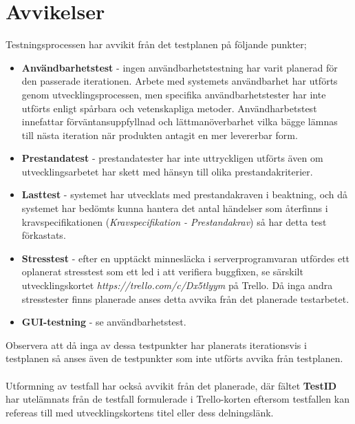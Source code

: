 \section{Avvikelser}
Testningsprocessen har avvikit från det testplanen på följande punkter; 

\begin{itemize}
\item \textbf{Användbarhetstest} - ingen användbarhetstestning har varit planerad för den passerade iterationen. Arbete med systemets användbarhet har utförts genom utvecklingsprocessen, men specifika användbarhetstester har inte utförts enligt spårbara och vetenskapliga metoder. Användharbetstest innefattar förväntansuppfyllnad och lättmanöverbarhet vilka bägge lämnas till nästa iteration när produkten antagit en mer levererbar form. 
\item \textbf{Prestandatest} - prestandatester har inte uttryckligen utförts även om utvecklingsarbetet har skett med hänsyn till olika prestandakriterier.
\item \textbf{Lasttest} - systemet har utvecklats med prestandakraven i beaktning, och då systemet har bedömts kunna hantera det antal händelser som återfinns i kravspecifikationen (\textit{Kravspecifikation - Prestandakrav}) så har detta test förkastats.
\item \textbf{Stresstest} - efter en upptäckt minnesläcka i serverprogramvaran utfördes ett oplanerat stresstest som ett led i att verifiera buggfixen, se särskilt utvecklingskortet \textit{https://trello.com/c/Dx5tlyym} på Trello. Då inga andra stresstester finns planerade anses detta avvika från det planerade testarbetet. 
\item \textbf{GUI-testning} - se användbarhetstest.
\end{itemize}
\medskip
Observera att då inga av dessa testpunkter har  planerats iterationsvis i testplanen så anses även de testpunkter som inte utförts avvika från testplanen.\\
\\
Utformning av testfall har också avvikit från det planerade, där fältet \textbf{TestID} har utelämnats från de testfall formulerade i Trello-korten eftersom testfallen kan refereas till med utvecklingskortens titel eller dess delningslänk.